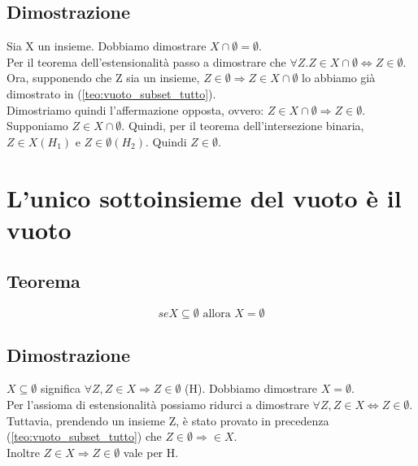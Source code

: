 \documentclass[12pt]{article}
\begin{document}
\subsection{Dimostrazione}
Sia X un insieme. Dobbiamo dimostrare $X \cap \emptyset = \emptyset$.\\
Per il teorema dell'estensionalità passo a dimostrare che $\forall Z. Z \in X \cap \emptyset \Leftrightarrow Z \in \emptyset$. Ora, supponendo che Z sia un insieme, $Z \in \emptyset \Rightarrow Z \in X \cap \emptyset$ lo abbiamo già dimostrato in (\ref{teo:vuoto_subset_tutto}).\\
Dimostriamo quindi l'affermazione opposta, ovvero: $Z \in X \cap \emptyset \Rightarrow Z \in \emptyset$. Supponiamo $Z \in X \cap \emptyset$. Quindi, per il teorema dell'intersezione binaria, $Z \in X (H_1) \text{ e } Z \in \emptyset (H_2)$. Quindi $Z \in \emptyset$.
\section{L'unico sottoinsieme del vuoto è il vuoto}
\subsection{Teorema}
\begin{equation}
    se X \subseteq \emptyset \text{ allora } X = \emptyset \label{teo:vuoto_unico_subset_vuoto}
\end{equation}
\subsection{Dimostrazione}
$X \subseteq \emptyset$ significa $\forall Z, Z \in X \Rightarrow Z \in \emptyset$ (H). Dobbiamo dimostrare $X = \emptyset$.\\
Per l'assioma di estensionalità possiamo ridurci a dimostrare $\forall Z, Z \in X \Leftrightarrow Z \in \emptyset$. Tuttavia, prendendo un insieme Z, è stato provato in precedenza (\ref{teo:vuoto_subset_tutto}) che $Z \in \emptyset \Rightarrow \in X$.\\
Inoltre $Z \in X \Rightarrow Z \in \emptyset$ vale per H.
\end{document}
